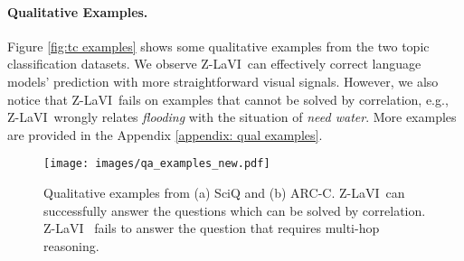 \documentclass[11pt]{article}
\newcommand{\model}{Z-LaVI}
\begin{document}
\begin{table}[!t]
\centering
\centering
{}
\caption{Statistics of ViComTe dataset.}
\label{tab: vicomte stat}
\vspace{-.2cm}
\end{table} 
\paragraph{Qualitative Examples.} Figure \ref{fig:tc examples} shows some qualitative examples from the two topic classification datasets. We observe \model~can effectively correct language models' prediction with more straightforward visual signals. However, we also notice that \model~fails on examples that cannot be solved by correlation, e.g., \model~wrongly relates \textit{flooding} with the situation of \textit{need water}. More examples are provided in the Appendix \ref{appendix: qual examples}.

\begin{figure}[!t]
\centering
    \texttt{[image: images/qa\_examples\_new.pdf]}
    \caption{Qualitative examples from (a) SciQ and (b) ARC-C. \model~can successfully answer the questions which can be solved by correlation. \model~ fails to answer the question that requires multi-hop reasoning.}
    \label{fig:qa_examples}
    \vspace{-.15cm}
\end{figure}
\end{document}
